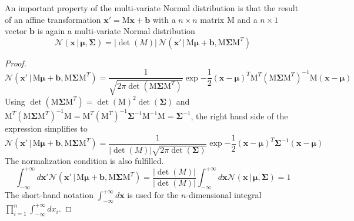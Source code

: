 \documentclass{tstextbook}
\begin{document}
\begin{theorem}
  \label{th:multivariatenormaldistributionunderaffinetransformation}
An important property of the multi-variate Normal distribution is that the result of an affine transformation $\mathbf{x}'=\mathrm{M}\mathbf{x}+\mathbf{b}$ with a $n\times n$ matrix $\mathrm{M}$ and a $n\times 1$ vector $\mathbf{b}$ is again a multi-variate Normal distribution   
  \begin{equation}
  \mathcal{N}\left(\mathbf{x}\,\vert\,\boldsymbol{\mu},\boldsymbol{\Sigma}\right)=
  \vert\det(M)\vert\,\mathcal{N}\left(\mathbf{x}'\,\vert\,\mathrm{M}\boldsymbol{\mu}+\mathbf{b},\mathrm{M}\boldsymbol{\Sigma}\mathrm{M}^T\right)
  \end{equation}
\end{theorem}
\begin{proof}
  \begin{equation}
\mathcal{N}\left(\mathbf{x}'\,\vert\,\mathrm{M}\boldsymbol{\mu}+\mathbf{b},\mathrm{M}\boldsymbol{\Sigma}\mathrm{M}^T\right)=
 \frac{1}{\sqrt{2\pi \det\left(\mathrm{M}\boldsymbol{\Sigma}\mathrm{M}^T\right)}}\exp{-\frac{1}{2}(\mathbf{x}-\boldsymbol{\mu})^T\mathrm{M}^T\left(\mathrm{M}\boldsymbol{\Sigma}\mathrm{M}^T\right)^{-1}\mathrm{M}(\mathbf{x}-\boldsymbol{\mu})}
 \end{equation}
 Using $\det\left(\mathrm{M}\boldsymbol{\Sigma}\mathrm{M}^T\right)=\det(\mathrm{M})^2 \det(\boldsymbol{\Sigma})$ and $\mathrm{M}^T\left(\mathrm{M}\boldsymbol{\Sigma}\mathrm{M}^T\right)^{-1}\mathrm{M} = \mathrm{M}^T(\mathrm{M}^T)^{-1}\boldsymbol{\Sigma}^{-1}\mathrm{M}^{-1}\mathrm{M}=\boldsymbol{\Sigma}^{-1}$, the right hand side of the expression simplifies to
  \begin{equation}
\mathcal{N}\left(\mathbf{x}'\,\vert\,\mathrm{M}\boldsymbol{\mu}+\mathbf{b},\mathrm{M}\boldsymbol{\Sigma}\mathrm{M}^T\right)=
 \frac{1}{\vert\det(M)\vert\sqrt{2\pi \det\left(\boldsymbol{\Sigma}\right)}}\exp{-\frac{1}{2}(\mathbf{x}-\boldsymbol{\mu})^T\boldsymbol{\Sigma}^{-1}(\mathbf{x}-\boldsymbol{\mu})}
 \end{equation}
 The normalization condition is also fulfilled.
   \begin{equation}
\int_{-\infty}^{+\infty}d\mathbf{x}'\mathcal{N}\left(\mathbf{x}'\,\vert\,\mathrm{M}\boldsymbol{\mu}+\mathbf{b},\mathrm{M}\boldsymbol{\Sigma}\mathrm{M}^T\right)=
 \frac{\vert\det(M)\vert}{\vert\det(M)\vert}\int_{-\infty}^{+\infty}d\mathbf{x}\mathcal{N}\left(\mathbf{x}\,\vert\,\boldsymbol{\mu},\boldsymbol{\Sigma}\right)=1
 \end{equation}
 The short-hand notation $\int_{-\infty}^{+\infty}d\mathbf{x}$ is used for the $n$-dimensional integral $\prod_{i=1}^n\int_{-\infty}^{+\infty}dx_i$.
 \end{proof}
\end{document}
